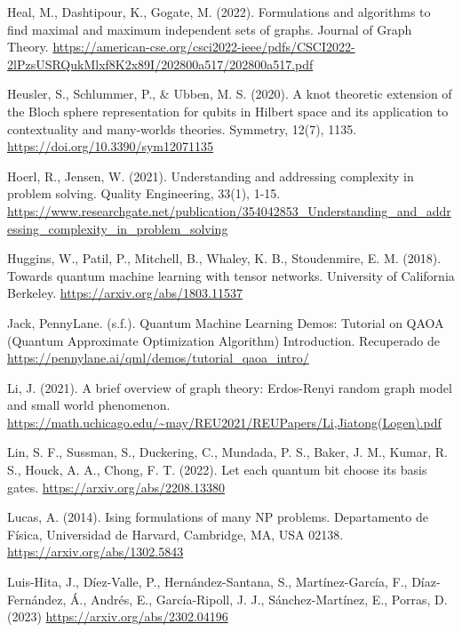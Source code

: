 \begin{thebibliography}{a}
Heal, M., Dashtipour, K., Gogate, M. (2022). Formulations and algorithms to find maximal and maximum independent sets of graphs. Journal of Graph Theory.
\url{https://american-cse.org/csci2022-ieee/pdfs/CSCI2022-2lPzsUSRQukMlxf8K2x89I/202800a517/202800a517.pdf}

Heusler, S., Schlummer, P., \& Ubben, M. S. (2020). A knot theoretic extension of the Bloch sphere representation for qubits in Hilbert space and its application to contextuality and many-worlds theories. Symmetry, 12(7), 1135. \url{https://doi.org/10.3390/sym12071135}

Hoerl, R., Jensen, W. (2021). Understanding and addressing complexity in problem solving. Quality Engineering, 33(1), 1-15.
\url{https://www.researchgate.net/publication/354042853_Understanding_and_addressing_complexity_in_problem_solving}

Huggins, W., Patil, P., Mitchell, B., Whaley, K. B., Stoudenmire, E. M. (2018). Towards quantum machine learning with tensor networks. University of California Berkeley.
\url{https://arxiv.org/abs/1803.11537}

Jack, PennyLane. (s.f.). Quantum Machine Learning Demos: Tutorial on QAOA (Quantum Approximate Optimization Algorithm) Introduction. Recuperado de \url{https://pennylane.ai/qml/demos/tutorial_qaoa_intro/}

Li, J. (2021). A brief overview of graph theory: Erdos-Renyi random graph model and small world phenomenon.
\url{https://math.uchicago.edu/~may/REU2021/REUPapers/Li,Jiatong(Logen).pdf}

Lin, S. F., Sussman, S., Duckering, C., Mundada, P. S., Baker, J. M., Kumar, R. S., Houck, A. A., Chong, F. T. (2022). Let each quantum bit choose its basis gates. 
\url{https://arxiv.org/abs/2208.13380}

Lucas, A. (2014). Ising formulations of many NP problems. Departamento de Física, Universidad de Harvard, Cambridge, MA, USA 02138.
\url{https://arxiv.org/abs/1302.5843}

Luis-Hita, J., Díez-Valle, P., Hernández-Santana, S., Martínez-García, F., Díaz-Fernández, Á., Andrés, E., García-Ripoll, J. J., Sánchez-Martínez, E., Porras, D. (2023)
\url{https://arxiv.org/abs/2302.04196}


\end{thebibliography}

